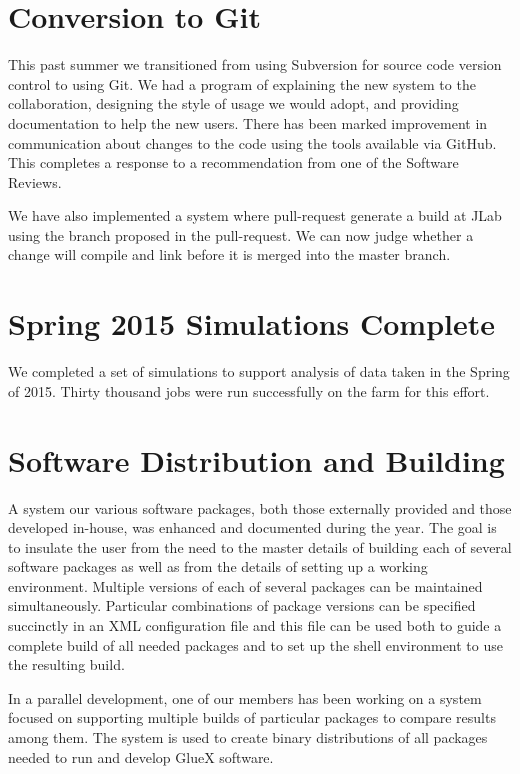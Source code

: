 \documentclass[12pt]{article}
\begin{document}
\section{Conversion to Git}

This past summer we transitioned from using Subversion for source code
version control to using Git. We had a program of explaining the new
system to the collaboration, designing the style of usage we would
adopt, and providing documentation to help the new users. There has
been marked improvement in communication about changes to the code
using the tools available via GitHub. This completes a response to a
recommendation from one of the Software Reviews.

We have also implemented a system where pull-request generate a build
at JLab using the branch proposed in the pull-request. We can now
judge whether a change will compile and link before it is merged into
the master branch.

\section{Spring 2015 Simulations Complete}

We completed a set of simulations to support analysis of data taken in
the Spring of 2015. Thirty thousand jobs were run successfully on the
farm for this effort.

\section{Software Distribution and Building}

A system our various software packages, both those externally provided
and those developed in-house, was enhanced and documented during the
year. The goal is to insulate the user from the need to the master
details of building each of several software packages as well as from
the details of setting up a working environment. Multiple versions of
each of several packages can be maintained simultaneously. Particular
combinations of package versions can be specified succinctly in an XML
configuration file and this file can be used both to guide a complete
build of all needed packages and to set up the shell environment to
use the resulting build.

In a parallel development, one of our members has been working on a
system focused on supporting multiple builds of particular packages to
compare results among them. The system is used to create binary
distributions of all packages needed to run and develop GlueX
software.
\end{document}
